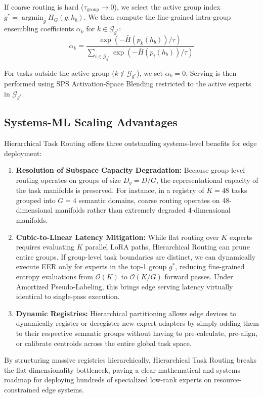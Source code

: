 \documentclass{article}
\theoremstyle{plain}
\theoremstyle{definition}
\theoremstyle{remark}
\begin{document}
If coarse routing is hard ($\tau_{\text{group}} \to 0$), we select the active group index $g^* = \operatorname{argmin}_g H_G(g, h_b)$. We then compute the fine-grained intra-group ensembling coefficients $\alpha_k$ for $k \in \mathcal{G}_{g^*}$:
\begin{equation}
\alpha_k = \frac{\exp\left(-\bar{H}(p_k(h_b)) / \tau\right)}{\sum_{i \in \mathcal{G}_{g^*}} \exp\left(-\bar{H}(p_i(h_b)) / \tau\right)}
\end{equation}

For tasks outside the active group ($k \notin \mathcal{G}_{g^*}$), we set $\alpha_k = 0$. Serving is then performed using SPS Activation-Space Blending restricted to the active experts in $\mathcal{G}_{g^*}$.

\subsection{Systems-ML Scaling Advantages}
Hierarchical Task Routing offers three outstanding systems-level benefits for edge deployment:
\begin{enumerate}
    \item \textbf{Resolution of Subspace Capacity Degradation:} Because group-level routing operates on groups of size $D_g = D / G$, the representational capacity of the task manifolds is preserved. For instance, in a registry of $K=48$ tasks grouped into $G=4$ semantic domains, coarse routing operates on 48-dimensional manifolds rather than extremely degraded 4-dimensional manifolds.
    \item \textbf{Cubic-to-Linear Latency Mitigation:} While flat routing over $K$ experts requires evaluating $K$ parallel LoRA paths, Hierarchical Routing can prune entire groups. If group-level task boundaries are distinct, we can dynamically execute EER only for experts in the top-1 group $g^*$, reducing fine-grained entropy evaluations from $\mathcal{O}(K)$ to $\mathcal{O}(K / G)$ forward passes. Under Amortized Pseudo-Labeling, this brings edge serving latency virtually identical to single-pass execution.
    \item \textbf{Dynamic Registries:} Hierarchical partitioning allows edge devices to dynamically register or deregister new expert adapters by simply adding them to their respective semantic groups without having to pre-calculate, pre-align, or calibrate centroids across the entire global task space.
\end{enumerate}

By structuring massive registries hierarchically, Hierarchical Task Routing breaks the flat dimensionality bottleneck, paving a clear mathematical and systems roadmap for deploying hundreds of specialized low-rank experts on resource-constrained edge systems.
\end{document}
